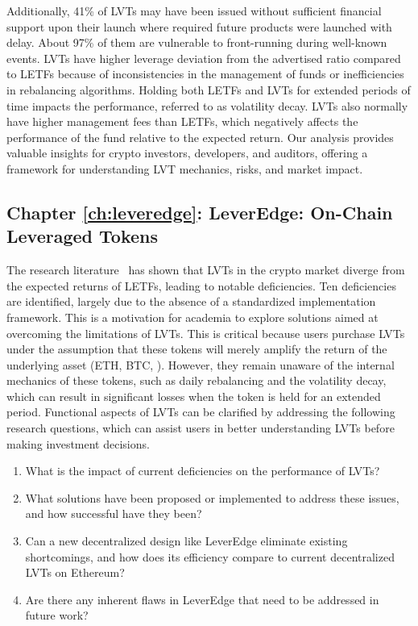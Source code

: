 Additionally, 41\% of LVTs may have been issued without sufficient financial support upon their launch where required future products were launched with delay. About 97\% of them are vulnerable to front-running during well-known events. LVTs have higher leverage deviation from the advertised ratio compared to LETFs because of inconsistencies in the management of funds or inefficiencies in rebalancing algorithms. Holding both LETFs and LVTs for extended periods of time impacts the performance, referred to as volatility decay. LVTs also normally have higher management fees than LETFs, which negatively affects the performance of the fund relative to the expected return. Our analysis provides valuable insights for crypto investors, developers, and auditors, offering a framework for understanding LVT mechanics, risks, and market impact.

\subsection{Chapter \ref{ch:leveredge}: LeverEdge: On-Chain Leveraged Tokens} 
The research literature~\cite{shortfall,khomyn2020value,szpruch2024leveraged,Sullivan_2009} has shown that LVTs in the crypto market diverge from the expected returns of LETFs, leading to notable deficiencies. Ten deficiencies are identified, largely due to the absence of a standardized implementation framework. This is a motivation for academia to explore solutions aimed at overcoming the limitations of LVTs. This is critical because users purchase LVTs under the assumption that these tokens will merely amplify the return of the underlying asset (ETH, BTC, \etc). However, they remain unaware of the internal mechanics of these tokens, such as daily rebalancing and the volatility decay, which can result in significant losses when the token is held for an extended period. Functional aspects of LVTs can be clarified by addressing the following research questions, which can assist users in better understanding LVTs before making investment decisions.
\begin{enumerate} [label={(RQ6.\arabic*)},leftmargin=*]
	\item What is the impact of current deficiencies on the performance of LVTs?
	\item What solutions have been proposed or implemented to address these issues, and how successful have they been?
	\item Can a new decentralized design like LeverEdge eliminate existing shortcomings, and how does its efficiency compare to current decentralized LVTs on Ethereum?
	\item Are there any inherent flaws in LeverEdge that need to be addressed in future work?
\end{enumerate}
